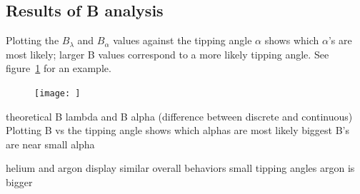 \documentclass[letterpaper,titlepage,12pt]{article}
\begin{document}
\subsection{Results of B analysis}
Plotting the \(B_\lambda\) and \(B_\alpha\) values against the tipping angle
\(\alpha\) shows which \(\alpha\)'s are most likely; larger B values correspond
to a more likely tipping angle.  See figure~\ref{fig:He_B_1921} for an example.
\begin{figure}
    \centering
    \texttt{[image: ]}
\label{fig:He_B_1921}
\end{figure}
\newline theoretical B lambda and B alpha (difference between discrete and continuous)
\newline Plotting B vs the tipping angle shows which alphas are most likely
\newline biggest B's are near small alpha

\newline helium and argon display similar overall behaviors
\newline small tipping angles
\newline argon is bigger
\end{document}
